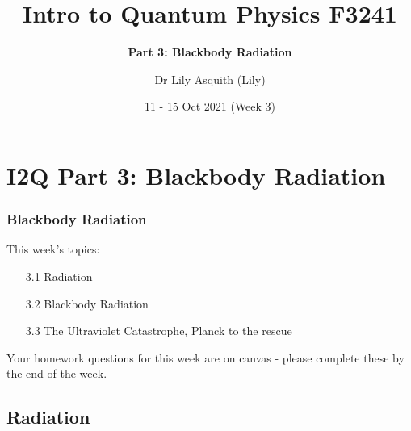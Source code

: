 


% 
\title[ Intro to Quantum Physics]{Intro to Quantum Physics F3241}
\subtitle{\textbf{Part 3: Blackbody Radiation}}
\author[Dr Lily Asquith (Lily)]{ Dr Lily Asquith (Lily)}
\date[11 - 15 Oct 2021]{ 11 - 15 Oct 2021 (Week 3)}





\begin{frame}
\titlepage
\end{frame} 

\section{I2Q Part 3: Blackbody Radiation}
\begin{frame}
\frametitle{Blackbody Radiation} 
\normalsize

This week's topics:\\[3ex]

\begin{itemize}
\item[3.1] Radiation\\[3ex]
\item[3.2] Blackbody Radiation\\[3ex]
\item[3.3] The Ultraviolet Catastrophe, Planck to the rescue\\[3ex]
\end{itemize}

Your homework questions for this week are on canvas - please complete these by the end of the week.
\end{frame} 
 
 
 \subsection{Radiation}

